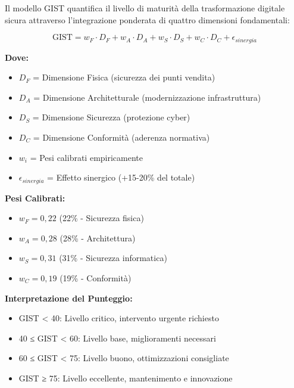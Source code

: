 \begin{tcolorbox}[
    colback=blue!5!white,
    colframe=blue!75!black,
    title={\textbf{Modello GIST - Global Integrated Security Transformation}},
    fonttitle=\bfseries\large,
    boxrule=1.5pt,
    arc=2mm,
    outer arc=2mm,
    breakable
]

Il modello GIST quantifica il livello di maturità della trasformazione digitale sicura attraverso l'integrazione ponderata di quattro dimensioni fondamentali:

\begin{equation}
\text{GIST} = w_F \cdot D_F + w_A \cdot D_A + w_S \cdot D_S + w_C \cdot D_C + \epsilon_{sinergia}
\label{eq:gist_formula}
\end{equation}

\textbf{Dove:}
\begin{itemize}
    \item $D_F$ = Dimensione Fisica (sicurezza dei punti vendita)
    \item $D_A$ = Dimensione Architetturale (modernizzazione infrastruttura)
    \item $D_S$ = Dimensione Sicurezza (protezione cyber)
    \item $D_C$ = Dimensione Conformità (aderenza normativa)
    \item $w_i$ = Pesi calibrati empiricamente
    \item $\epsilon_{sinergia}$ = Effetto sinergico (+15-20\% del totale)
\end{itemize}

\textbf{Pesi Calibrati:}
\begin{itemize}
    \item $w_F = 0,22$ (22\% - Sicurezza fisica)
    \item $w_A = 0,28$ (28\% - Architettura)
    \item $w_S = 0,31$ (31\% - Sicurezza informatica)
    \item $w_C = 0,19$ (19\% - Conformità)
\end{itemize}

\textbf{Interpretazione del Punteggio:}
\begin{itemize}
    \item GIST < 40: Livello critico, intervento urgente richiesto
    \item 40 ≤ GIST < 60: Livello base, miglioramenti necessari
    \item 60 ≤ GIST < 75: Livello buono, ottimizzazioni consigliate
    \item GIST ≥ 75: Livello eccellente, mantenimento e innovazione
\end{itemize}

\end{tcolorbox}


